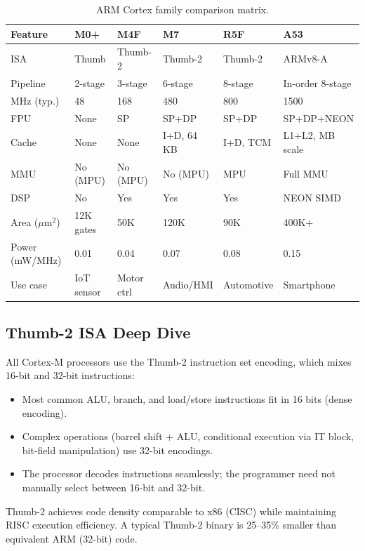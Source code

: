 \begin{table}[H]
\centering
\caption{ARM Cortex family comparison matrix.}
\label{tab:proc:armfamily}
\begin{tabularx}{\textwidth}{l X X X X X}
\toprule
\textbf{Feature} & \textbf{M0+} & \textbf{M4F} & \textbf{M7} & \textbf{R5F} & \textbf{A53} \\
\midrule
ISA & Thumb & Thumb-2 & Thumb-2 & Thumb-2 & ARMv8-A \\
Pipeline & 2-stage & 3-stage & 6-stage & 8-stage & In-order 8-stage \\
MHz (typ.) & 48 & 168 & 480 & 800 & 1500 \\
FPU & None & SP & SP+DP & SP+DP & SP+DP+NEON \\
Cache & None & None & I+D, 64\,KB & I+D, TCM & L1+L2, MB scale \\
MMU & No (MPU) & No (MPU) & No (MPU) & MPU & Full MMU \\
DSP & No & Yes & Yes & Yes & NEON SIMD \\
Area ($\mu$m$^2$) & 12K gates & 50K & 120K & 90K & 400K+ \\
Power (mW/MHz) & 0.01 & 0.04 & 0.07 & 0.08 & 0.15 \\
Use case & IoT sensor & Motor ctrl & Audio/HMI & Automotive & Smartphone \\
\bottomrule
\end{tabularx}
\end{table}

\subsection{Thumb-2 ISA Deep Dive}

All Cortex-M processors use the Thumb-2 instruction set encoding, which mixes 16-bit and 32-bit instructions:
\begin{itemize}
  \item Most common ALU, branch, and load/store instructions fit in 16 bits (dense encoding).
  \item Complex operations (barrel shift + ALU, conditional execution via IT block, bit-field manipulation) use 32-bit encodings.
  \item The processor decodes instructions seamlessly; the programmer need not manually select between 16-bit and 32-bit.
\end{itemize}

\begin{insight}
Thumb-2 achieves code density comparable to x86 (CISC) while maintaining RISC execution efficiency. A typical Thumb-2 binary is 25--35\% smaller than equivalent ARM (32-bit) code.
\end{insight}

